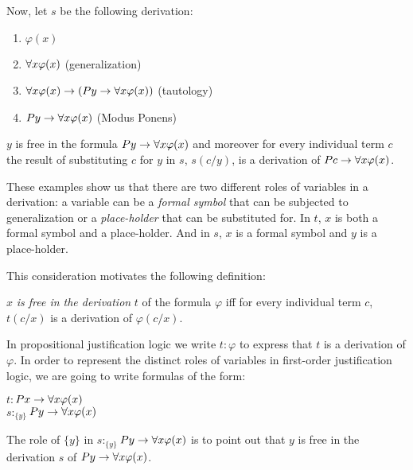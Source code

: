\qquad Now, let $s$ be the following derivation:
	
\begin{enumerate}[1.]
\item $\varphi(x)$ 
\item $\forall x \varphi(x)$                 (generalization)
\item $\forall x\varphi(x) \rightarrow (Py \rightarrow \forall x\varphi(x))$ (tautology)
\item $Py \rightarrow \forall x\varphi(x)$ (Modus Ponens)
\end{enumerate}
	
\qquad $y$ is free in the formula $Py \rightarrow \forall x\varphi(x)$ and moreover for every individual term $c$ the result of substituting $c$ for $y$ in $s$, $s(c/y)$, is a  derivation of $Pc \rightarrow \forall x\varphi(x)$.


\qquad These examples show us that there are two different roles of variables in a derivation: a variable can be a \textit{formal symbol} that can be subjected to generalization or a \textit{place-holder} that can be substituted for. In $t$, $x$ is both a formal symbol and a place-holder. And in $s$, $x$ is a formal symbol and $y$ is a place-holder.
	
\qquad This consideration motivates the following definition:
	
\begin{center}
$x$ \textit{is free in the derivation} $t$ of the formula $\varphi$ iff for every individual term $c$, $t(c/x)$ is a derivation of $\varphi(c/x)$.
\end{center}

	
\qquad In propositional justification logic we write $t$$: $$\varphi$ to express that $t$ is a derivation of $\varphi$. In order to represent the distinct roles of variables in first-order justification logic, we are going to write formulas of the form:

\begin{center}
$t$$:$$Px \rightarrow \forall x\varphi(x)$\\
$s$$:_{\{y\}}$$Py \rightarrow \forall x\varphi(x)$
\end{center}
	
	
\qquad The role of $\{y\}$ in $s$$:_{\{y\}}$$Py \rightarrow \forall x\varphi(x)$ is to point out that $y$ is free in the derivation $s$ of $Py \rightarrow \forall x\varphi(x)$. 



